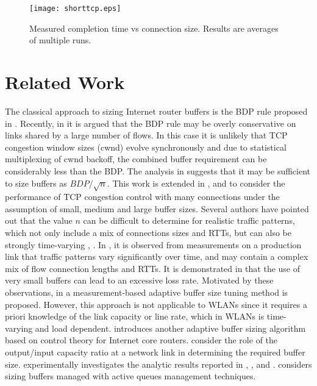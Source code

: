 \documentclass[10pt,twocolumn, journal]{IEEEtran}
\begin{document}
\begin{figure}[tb]
    \centering
    \texttt{[image: shorttcp.eps]}
    \caption{Measured completion time vs connection size. Results are averages of multiple runs.}
    \label{fig_motivation_short}
\end{figure}




\section{Related Work}\label{sec_related_work}

The classical approach to sizing Internet router buffers is the BDP rule proposed in
\cite{Vallamizar_CCR_1994}. Recently, in \cite{Appenzeller_SIGCOMM_2004} it is argued
that the BDP rule may be overly conservative on links shared by a large number of flows.
In this case it is unlikely that TCP congestion window sizes (cwnd) evolve synchronously
and due to statistical multiplexing of cwnd backoff, the combined buffer requirement can
be considerably less than the BDP. The analysis in \cite{Appenzeller_SIGCOMM_2004}
suggests that it may be sufficient to size buffers as $BDP/\sqrt{n}$.  This work is
extended in \cite{Raina_NGI_2005}, \cite{Enachescu_INFOCOM_2006} and
\cite{Wischik_CCR_2005} to consider the performance of TCP congestion control with many
connections under the assumption of small, medium and large buffer sizes. Several authors
have pointed out that the value $n$ can be difficult to determine for realistic traffic
patterns, which not only include a mix of connections sizes and RTTs, but can also be
strongly time-varying \cite{Dhamdhere_ccr_2006}, \cite{Vu-Brugier_CCR_2007}. In
\cite{Vu-Brugier_CCR_2007}, it is observed from measurements on a production link that
traffic patterns vary significantly over time, and may contain a complex mix of flow
connection lengths and RTTs. It is demonstrated in
\cite{Dhamdhere_ccr_2006}\cite{Vu-Brugier_CCR_2007} that the use of very small buffers
can lead to an excessive loss rate.  Motivated by these observations, in
\cite{Rade_Letters_2006} \cite{Kellett_CDC_2006} a measurement-based adaptive buffer size
tuning method is proposed.  However, this approach is not applicable to WLANs since it
requires a priori knowledge of the link capacity or line rate, which in WLANs is
time-varying and load dependent.  \cite{Zhang_Iwqos_2008} introduces another adaptive buffer sizing algorithm based on control theory for Internet core routers. \cite{Prasad_ton_toappear,Lakshmikantha_infocom_2008} consider the role of the output/input capacity ratio at a network link in determining the required buffer size. \cite{Beheshti_imc_2008} experimentally investigates the analytic results reported in \cite{Appenzeller_SIGCOMM_2004}, \cite{Raina_NGI_2005}, \cite{Enachescu_INFOCOM_2006} and \cite{Wischik_CCR_2005}.   \cite{Eun_Ton_2008} considers sizing buffers managed with active queues management techniques.
\end{document}
